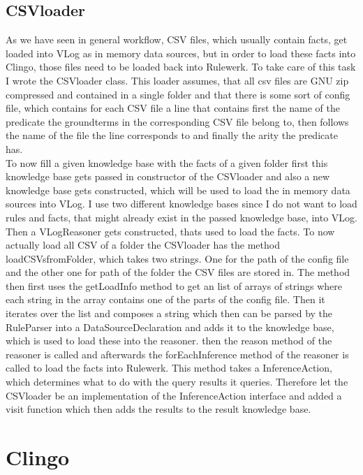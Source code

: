 \documentclass[hyperref, bachelorofscience]{cgvpub}
\begin{document}
\subsection{CSVloader}
As we have seen in general workflow, CSV files, which usually contain facts, get loaded into VLog as in memory data sources, but in order to load these facts into Clingo, those files need to be loaded back into Rulewerk. To take care of this task I wrote the CSVloader class. This loader assumes, that all csv files are GNU zip compressed and contained in a single folder and that there is some sort of config file, which contains for each CSV file a line that contains first the name of the predicate the groundterms in the corresponding CSV file belong to, then follows the name of the file the line corresponds to and finally the arity the predicate has.\\
To now fill a given knowledge base with the facts of a given folder first this knowledge base gets passed in constructor of the CSVloader and also a new knowledge base gets constructed, which will be used to load the in memory data sources into VLog. I use two different knowledge bases since I do not want to load rules and facts, that might already exist in the passed knowledge base, into VLog. Then a VLogReasoner gets constructed, thats used to load the facts. To now actually load all CSV of a folder the CSVloader has the method loadCSVsfromFolder, which takes two strings. One for the path of the config file and the other one for path of the folder the CSV files are stored in. The method then first uses the getLoadInfo method to get an list of arrays of strings where each string in the array contains one of the parts of the config file. Then it iterates over the list and composes a string which then can be parsed by the RuleParser into a DataSourceDeclaration and adds it to the knowledge base, which is used to load these into the reasoner. then the reason method of the reasoner is called and afterwards the forEachInference method of the reasoner is called to load the facts into Rulewerk. This method takes a InferenceAction, which determines what to do with the query results it queries. Therefore let the CSVloader be an implementation of the InferenceAction interface and added a visit function which then adds the results to the result knowledge base.

\section{Clingo}
\end{document}
